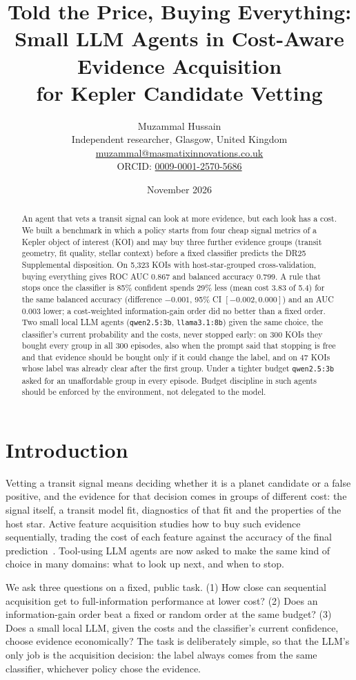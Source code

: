 \documentclass[11pt,a4paper]{article}
\title{\textbf{Told the Price, Buying Everything:\\Small LLM Agents in Cost-Aware Evidence Acquisition\\for Kepler Candidate Vetting}}
\author{Muzammal Hussain\\
\small Independent researcher, Glasgow, United Kingdom\\
\small \href{mailto:muzammal@masmatixinnovations.co.uk}{muzammal@masmatixinnovations.co.uk}\\
\small ORCID: \href{https://orcid.org/0009-0001-2570-5686}{0009-0001-2570-5686}}
\date{\small November 2026}
\newcommand{\code}[1]{\texttt{#1}}
\begin{document}
\maketitle

\begin{abstract}
\noindent
An agent that vets a transit signal can look at more evidence, but each look has a cost. We built a benchmark in
which a policy starts from four cheap signal metrics of a Kepler object of interest (KOI) and may buy three further
evidence groups (transit geometry, fit quality, stellar context) before a fixed classifier predicts the DR25
Supplemental disposition. On 5,323 KOIs with host-star-grouped cross-validation, buying everything gives ROC AUC
0.867 and balanced accuracy 0.799. A rule that stops once the classifier is 85\% confident spends 29\% less
(mean cost 3.83 of 5.4) for the same balanced accuracy (difference $-0.001$, 95\% CI $[-0.002, 0.000]$) and an
AUC 0.003 lower; a cost-weighted information-gain order did no better than a fixed order. Two small local LLM agents
(\code{qwen2.5:3b}, \code{llama3.1:8b}) given the same choice, the classifier's current probability and the costs,
never stopped early: on 300 KOIs they bought every group in all 300 episodes, also when the prompt said that stopping
is free and that evidence should be bought only if it could change the label, and on 47 KOIs whose label was already
clear after the first group. Under a tighter budget \code{qwen2.5:3b} asked for an unaffordable group in every
episode. Budget discipline in such agents should be enforced by the environment, not delegated to the model.
\end{abstract}

\section{Introduction}

Vetting a transit signal means deciding whether it is a planet candidate or a false positive, and the evidence for
that decision comes in groups of different cost: the signal itself, a transit model fit, diagnostics of that fit and
the properties of the host star. Active feature acquisition studies how to buy such evidence sequentially, trading
the cost of each feature against the accuracy of the final prediction~\cite{saar2009afa,aronsson2026afa}. Tool-using
LLM agents are now asked to make the same kind of choice in many domains: what to look up next, and when to stop.

We ask three questions on a fixed, public task. (1) How close can sequential acquisition get to full-information
performance at lower cost? (2) Does an information-gain order beat a fixed or random order at the same budget?
(3) Does a small local LLM, given the costs and the classifier's current confidence, choose evidence economically?
The task is deliberately simple, so that the LLM's only job is the acquisition decision: the label always comes from
the same classifier, whichever policy chose the evidence.
\end{document}
